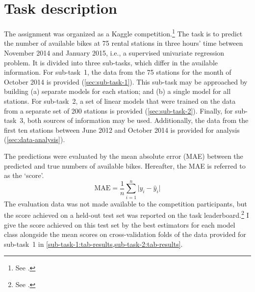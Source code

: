 \section{Task description}
\label{sec:task-description}

The assignment was organized as a Kaggle competition.\footnote{See .}
The task is to predict the number of available bikes at 75 rental stations in three
hours' time between November 2014 and January 2015, i.e., a supervised univariate
regression problem.
It is divided into three sub-tasks, which differ in the available information.
For sub-task~1, the data from the 75 stations for the month of October 2014 is provided
(\cref{sec:sub-task-1}).
This sub-task may be approached by building (a) separate models for each station; and
(b) a single model for all stations.
For sub-task~2, a set of linear models that were trained on the data from a separate
set of 200 stations is provided (\cref{sec:sub-task-2}).
Finally, for sub-task~3, both sources of information may be used.
Additionally, the data from the first ten stations between June 2012 and October 2014
is provided for analysis (\cref{sec:data-analysis}).

The predictions were evaluated by the mean absolute error (MAE) between the predicted
and true numbers of available bikes.
Hereafter, the MAE is referred to as the `score'.
\begin{equation}
  \text{MAE} = \frac{1}{n} \sum_{i = 1}^n \lvert y_i - \hat{y}_i \rvert
\end{equation}
The evaluation data was not made available to the competition participants, but the
score achieved on a held-out test set was reported on the task
leaderboard.\footnote{See .} I give the score achieved on this test
set by the best estimators for each model class alongside the mean scores on
cross-validation folds of the data provided for sub-task~1 in
\cref{sub-task-1:tab-results,sub-task-2:tab-results}.
